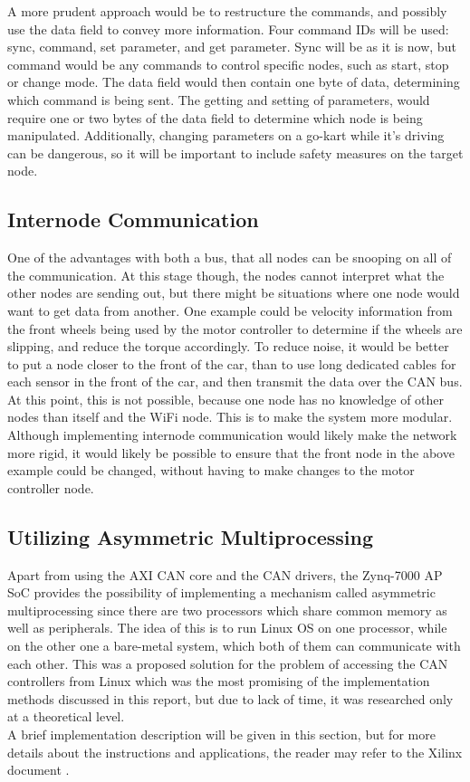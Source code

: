 A more prudent approach would be to restructure the commands, and possibly use the data field to convey more information. 
Four command IDs will be used: sync, command, set parameter, and get parameter. 
Sync will be as it is now, but command would be any commands to control specific nodes, such as start, stop or change mode. 
The data field would then contain one byte of data, determining which command is being sent.
The getting and setting of parameters, would require one or two bytes of the data field to determine which node is being manipulated.
Additionally, changing parameters on a go-kart while it's driving can be dangerous, so it will be important to include safety measures on the target node.

\subsection*{Internode Communication}
One of the advantages with both a bus, that all nodes can be snooping on all of the communication.
At this stage though, the nodes cannot interpret what the other nodes are sending out, but there might be situations where one node would want to get data from another.
One example could be velocity information from the front wheels being used by the motor controller to determine if the wheels are slipping, and reduce the torque accordingly. 
To reduce noise, it would be better to put a node closer to the front of the car, than to use long dedicated cables for each sensor in the front of the car, and then transmit the data over the CAN bus.\\

At this point, this is not possible, because one node has no knowledge of other nodes than itself and the WiFi node. 
This is to make the system more modular.
Although implementing internode communication would likely make the network more rigid, it would likely be possible to ensure that the front node in the above example could be changed, without having to make changes to the motor controller node.

\subsection*{Utilizing Asymmetric Multiprocessing}

Apart from using the AXI CAN core and the CAN drivers, the Zynq-7000 AP SoC provides the possibility of implementing a mechanism called asymmetric multiprocessing since there are two processors which share common memory as well as peripherals.
The idea of this is to run Linux OS on one processor, while on the other one a bare-metal system, which both of them can communicate with each other.
This was a proposed solution for the problem of accessing the CAN controllers from Linux which was the most promising of the implementation methods discussed in this report, but due to lack of time, it was researched only at a theoretical level.
\\
A brief implementation description will be given in this section, but for more details about the instructions and applications, the reader may refer to the Xilinx document \cite{Xilinx_AMP}.

